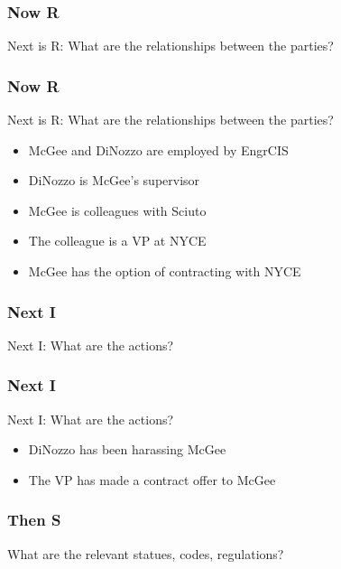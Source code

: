 \begin{frame}
\frametitle{Now R}

Next is R:  What are the relationships between the parties? 


\end{frame}

\begin{frame}
\frametitle{Now R}

Next is R:  What are the relationships between the parties? 

\begin{itemize}
	\item McGee  and DiNozzo are employed by EngrCIS
	\item DiNozzo is McGee's supervisor 
	\item McGee is colleagues with Sciuto
	\item The colleague is a VP at NYCE
	\item McGee has the option of contracting with NYCE
\end{itemize}


\end{frame}

\begin{frame}
\frametitle{Next I}

Next I: What are the actions?


\end{frame}

\begin{frame}
\frametitle{Next I}

Next I: What are the actions?

\begin{itemize}
	\item DiNozzo has been harassing McGee
	\item The VP has made a contract offer to McGee
\end{itemize}

\end{frame}



\begin{frame}
\frametitle{Then S}

What are the relevant statues, codes, regulations?

\end{frame}



